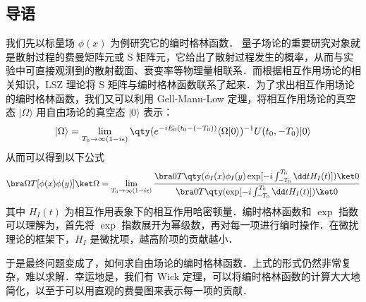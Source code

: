 
\subsection{导语}
我们先以标量场 $\phi(x)$ 为例研究它的编时格林函数．
量子场论的重要研究对象就是散射过程的费曼矩阵元或 S 矩阵元，它给出了散射过程发生的概率，从而与实验中可直接观测到的散射截面、衰变率等物理量相联系．而根据相互作用场论的相关知识，LSZ 理论将 S 矩阵与编时格林函数联系了起来．为了求出相互作用场论的编时格林函数，我们又可以利用 Gell-Mann-Low 定理，将相互作用场论的真空态 $|\Omega\rangle$ 用自由场论的真空态 $|0\rangle$ 表示：
\begin{equation}
|\Omega\rangle = \lim\limits_{T_0\rightarrow \infty(1-i\epsilon)}\qty(e^{-iE_0(t_0-(-T_0))}\langle \Omega|0\rangle )^{-1}U(t_0,-T_0)|0\rangle
\end{equation}
从而可以得到以下公式
\begin{equation}
\bra\Omega T[\phi(x)\phi(y)]\ket\Omega = \lim\limits_{T_0\rightarrow \infty(1-i\epsilon)}\frac{\bra 0 T\qty(\phi_I(x)\phi_I(y)\exp[-i\int_{-T_0}^{T_0}\dd t H_I(t)])\ket 0}{\bra 0 T\qty(\exp[-i\int_{-T_0}^{T_0}\dd t H_I(t)])\ket 0}
\end{equation}
其中 $H_I(t)$ 为相互作用表象下的相互作用哈密顿量．编时格林函数和 $\exp$ 指数可以理解为，首先将 $\exp$ 指数展开为幂级数，再对每一项进行编时操作．在微扰理论的框架下，$H_I$ 是微扰项，越高阶项的贡献越小．

于是最终问题变成了，如何求自由场论的编时格林函数．上式的形式仍然非常复杂，难以求解．幸运地是，我们有 Wick 定理，可以将编时格林函数的计算大大地简化，以至于可以用直观的费曼图来表示每一项的贡献．
